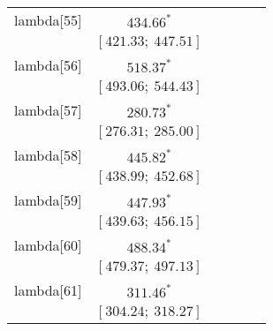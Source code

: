 \begin{table}
\begin{center}
\begin{tabular}{l c c c c c }
lambda[55]  & $434.66^{*}$                     &                           &                           &                         &                         \\
            & $[421.33;\ 447.51]$              &                           &                           &                         &                         \\
lambda[56]  & $518.37^{*}$                     &                           &                           &                         &                         \\
            & $[493.06;\ 544.43]$              &                           &                           &                         &                         \\
lambda[57]  & $280.73^{*}$                     &                           &                           &                         &                         \\
            & $[276.31;\ 285.00]$              &                           &                           &                         &                         \\
lambda[58]  & $445.82^{*}$                     &                           &                           &                         &                         \\
            & $[438.99;\ 452.68]$              &                           &                           &                         &                         \\
lambda[59]  & $447.93^{*}$                     &                           &                           &                         &                         \\
            & $[439.63;\ 456.15]$              &                           &                           &                         &                         \\
lambda[60]  & $488.34^{*}$                     &                           &                           &                         &                         \\
            & $[479.37;\ 497.13]$              &                           &                           &                         &                         \\
lambda[61]  & $311.46^{*}$                     &                           &                           &                         &                         \\
            & $[304.24;\ 318.27]$              &                           &                           &                         &                         \\

\end{tabular}
\end{center}
\end{table}
